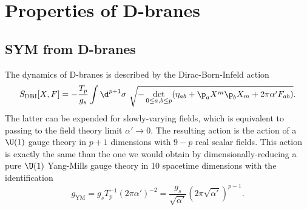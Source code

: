 \section{Properties of D-branes}

    \subsection{SYM from D-branes}

        The dynamics of D-branes is described by the Dirac-Born-Infeld action
        \begin{equation}
            S_{\text{DBI}}[X,F] = -\frac{T_p}{g_s}\int\d^{p+1}\sigma~\sqrt{-\det\limits_{0\leq a,b\leq p}(\eta_{ab}+\p_a X^m\p_b X_m+2\pi\alpha'F_{ab})}.
        \end{equation}
        The latter can be expended for slowly-varying ﬁelds, which is equivalent to passing to the ﬁeld theory limit $\alpha'\to0$. The resulting action is the action of a $\U(1)$ gauge theory in $p+1$ dimensions with $9-p$ real scalar fields. This action is exactly the same than the one we would obtain by dimensionally-reducing a pure $\U(1)$ Yang-Mills gauge theory in 10 spacetime dimensions with the identification
        \begin{equation}
            g_{\text{YM}}=g_sT^{-1}_p(2\pi\alpha')^{-2}=\frac{g_s}{\sqrt{\alpha'}}(2\pi\sqrt{\alpha'})^{p-1}.
        \end{equation}

